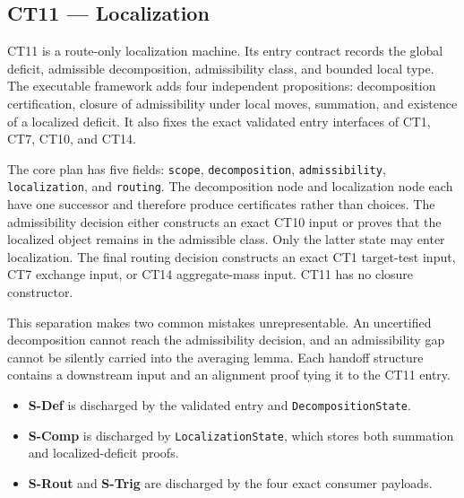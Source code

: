 \subsection{CT11 --- Localization}\label{ct:11}\label{additivity-and-the-localization-lemma}

CT11 is a route-only localization machine.  Its entry contract records the
global deficit, admissible decomposition, admissibility class, and bounded
local type.  The executable framework adds four independent propositions:
decomposition certification, closure of admissibility under local moves,
summation, and existence of a localized deficit.  It also fixes the exact
validated entry interfaces of CT1, CT7, CT10, and CT14.

The core plan has five fields: \texttt{scope}, \texttt{decomposition},
\texttt{admissibility}, \texttt{localization}, and \texttt{routing}.  The
decomposition node and localization node each have one successor and therefore
produce certificates rather than choices.  The admissibility decision either
constructs an exact CT10 input or proves that the localized object remains in
the admissible class.  Only the latter state may enter localization.  The final
routing decision constructs an exact CT1 target-test input, CT7 exchange input,
or CT14 aggregate-mass input.  CT11 has no closure constructor.

This separation makes two common mistakes unrepresentable.  An uncertified
decomposition cannot reach the admissibility decision, and an admissibility gap
cannot be silently carried into the averaging lemma.  Each handoff structure
contains a downstream input and an alignment proof tying it to the CT11 entry.

\begin{itemize}
\tightlist
\item \textbf{S-Def} is discharged by the validated entry and \texttt{DecompositionState}.
\item \textbf{S-Comp} is discharged by \texttt{LocalizationState}, which stores both summation and localized-deficit proofs.
\item \textbf{S-Rout} and \textbf{S-Trig} are discharged by the four exact consumer payloads.
\end{itemize}

